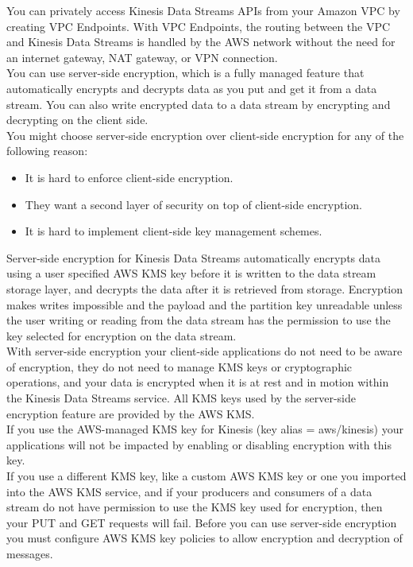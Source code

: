 \documentclass[12pt, letterpaper, twoside]{article}
\begin{document}
You can privately access Kinesis Data Streams APIs from your Amazon VPC by creating VPC Endpoints. With VPC Endpoints, the routing 
between the VPC and Kinesis Data Streams is handled by the AWS network without the need for an internet gateway, NAT gateway, or VPN 
connection.\\

You can use server-side encryption, which is a fully managed feature that automatically encrypts and decrypts data as you put and get 
it from a data stream. You can also write encrypted data to a data stream by encrypting and decrypting on the client side.\\

You might choose server-side encryption over client-side encryption for any of the following reason:
\begin{itemize}
	\item It is hard to enforce client-side encryption.
	\item They want a second layer of security on top of client-side encryption.
	\item It is hard to implement client-side key management schemes.
\end{itemize}
	
Server-side encryption for Kinesis Data Streams automatically encrypts data using a user specified AWS KMS key before it is written 
to the data stream storage layer, and decrypts the data after it is retrieved from storage. Encryption makes writes impossible and the 
payload and the partition key unreadable unless the user writing or reading from the data stream has the permission to use the key selected 
for encryption on the data stream.\\

With server-side encryption your client-side applications do not need to be aware of encryption, they do not need to manage KMS keys or 
cryptographic operations, and your data is encrypted when it is at rest and in motion within the Kinesis Data Streams service. 
All KMS keys used by the server-side encryption feature are provided by the AWS KMS.\\

If you use the AWS-managed KMS key for Kinesis (key alias = aws/kinesis) your applications will not be impacted by enabling or disabling 
encryption with this key.\\

If you use a different KMS key, like a custom AWS KMS key or one you imported into the AWS KMS service, and if your producers and 
consumers of a data stream do not have permission to use the KMS key used for encryption, then your PUT and GET requests will fail. 
Before you can use server-side encryption you must configure AWS KMS key policies to allow encryption and decryption of messages.\\
\end{document}
